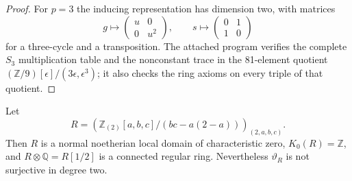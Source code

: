 \begin{proof}
For $p=3$ the inducing representation has dimension two, with matrices
\[
 g\longmapsto\begin{pmatrix}u&0\\0&u^2\end{pmatrix},\qquad
 s\longmapsto\begin{pmatrix}0&1\\1&0\end{pmatrix}
\]
for a three-cycle and a transposition. The attached program
 verifies the complete
$S_3$ multiplication table and the nonconstant trace in the 81-element
quotient $(\mathbb Z/9)[\epsilon]/(3\epsilon,\epsilon^3)$; it also checks
the ring axioms on every triple of that quotient.
\end{proof}

\begin{proposition}
\label{C:normal_domain_counterexample}
Let
\[
 R=\left(\mathbb Z_{(2)}[a,b,c]/(bc-a(2-a))\right)_{(2,a,b,c)}.
\]
Then $R$ is a normal noetherian local domain of characteristic zero,
$K_0(R)=\mathbb Z$, and $R\otimes\mathbb Q=R[1/2]$ is a connected regular
ring. Nevertheless $\vartheta_R$ is not surjective in degree two.
\end{proposition}

